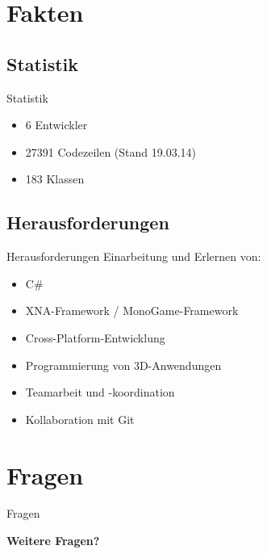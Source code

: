 \documentclass[18pt]{beamer}
\begin{document}
\section{Fakten}
\subsection{Statistik}
\begin{frame}{Statistik}
\begin{itemize}
\item 6 Entwickler
\item 27391 Codezeilen (Stand 19.03.14)
\item 183 Klassen
\end{itemize}
\end{frame}

\subsection{Herausforderungen}
\begin{frame} {Herausforderungen}
Einarbeitung und Erlernen von:
\begin{itemize}
\item C\#
\item XNA-Framework / MonoGame-Framework
\item Cross-Platform-Entwicklung
\item Programmierung von 3D-Anwendungen
\item Teamarbeit und -koordination
\item Kollaboration mit Git
\end{itemize}
\end{frame}


\section{Fragen}
\begin{frame}{Fragen}
\begin{center}
\Huge \textbf{Weitere Fragen?}
\end{center}
\end{frame}



%
%
\end{document}
